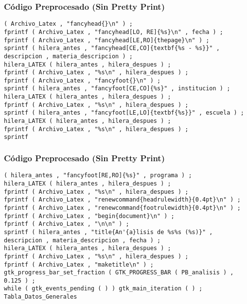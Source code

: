 \documentclass{beamer}
\begin{document}
\begin{frame}[fragile]
\frametitle{C\'odigo Preprocesado (Sin Pretty Print)}
\begin{lstlisting}[style=CStyle]
( Archivo_Latex , "fancyhead{}\n" ) ; 
fprintf ( Archivo_Latex , "fancyhead[LO, RE]{%s}\n" , fecha ) ; 
fprintf ( Archivo_Latex , "fancyhead[LE,RO]{thepage}\n" ) ; 
sprintf ( hilera_antes , "fancyhead[CE,CO]{textbf{%s - %s}}" , descripcion , materia_descripcion ) ; 
hilera_LATEX ( hilera_antes , hilera_despues ) ; 
fprintf ( Archivo_Latex , "%s\n" , hilera_despues ) ; 
fprintf ( Archivo_Latex , "fancyfoot{}\n" ) ; 
sprintf ( hilera_antes , "fancyfoot[CE,CO]{%s}" , institucion ) ; 
hilera_LATEX ( hilera_antes , hilera_despues ) ; 
fprintf ( Archivo_Latex , "%s\n" , hilera_despues ) ; 
sprintf ( hilera_antes , "fancyfoot[LE,LO]{textbf{%s}}" , escuela ) ; 
hilera_LATEX ( hilera_antes , hilera_despues ) ; 
fprintf ( Archivo_Latex , "%s\n" , hilera_despues ) ; 
sprintf \end{lstlisting}
\end{frame}
\begin{frame}[fragile]
\frametitle{C\'odigo Preprocesado (Sin Pretty Print)}
\begin{lstlisting}[style=CStyle]
( hilera_antes , "fancyfoot[RE,RO]{%s}" , programa ) ; 
hilera_LATEX ( hilera_antes , hilera_despues ) ; 
fprintf ( Archivo_Latex , "%s\n" , hilera_despues ) ; 
fprintf ( Archivo_Latex , "renewcommand{headrulewidth}{0.4pt}\n" ) ; 
fprintf ( Archivo_Latex , "renewcommand{footrulewidth}{0.4pt}\n" ) ; 
fprintf ( Archivo_Latex , "begin{document}\n" ) ; 
fprintf ( Archivo_Latex , "\n\n" ) ; 
sprintf ( hilera_antes , "title{An'{a}lisis de %s%s (%s)}" , descripcion , materia_descripcion , fecha ) ; 
hilera_LATEX ( hilera_antes , hilera_despues ) ; 
fprintf ( Archivo_Latex , "%s\n" , hilera_despues ) ; 
fprintf ( Archivo_Latex , "maketitle\n" ) ; 
gtk_progress_bar_set_fraction ( GTK_PROGRESS_BAR ( PB_analisis ) , 0.125 ) ; 
while ( gtk_events_pending ( ) ) gtk_main_iteration ( ) ; 
Tabla_Datos_Generales \end{lstlisting}
\end{frame}
\end{document}
